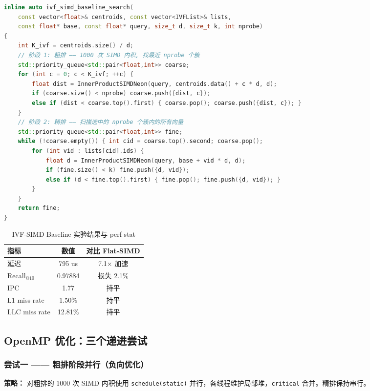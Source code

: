 \documentclass[UTF8,a4paper,10pt]{ctexart}
\begin{document}
\begin{lstlisting}[language=C++, caption={IVF-SIMD 纯串行 Baseline (IVF-baseline.cc)}]
inline auto ivf_simd_baseline_search(
    const vector<float>& centroids, const vector<IVFList>& lists,
    const float* base, const float* query, size_t d, size_t k, int nprobe)
{
    int K_ivf = centroids.size() / d;
    // 阶段 1: 粗排 —— 1000 次 SIMD 内积, 找最近 nprobe 个簇
    std::priority_queue<std::pair<float,int>> coarse;
    for (int c = 0; c < K_ivf; ++c) {
        float dist = InnerProductSIMDNeon(query, centroids.data() + c * d, d);
        if (coarse.size() < nprobe) coarse.push({dist, c});
        else if (dist < coarse.top().first) { coarse.pop(); coarse.push({dist, c}); }
    }
    // 阶段 2: 精排 —— 扫描选中的 nprobe 个簇内的所有向量
    std::priority_queue<std::pair<float,int>> fine;
    while (!coarse.empty()) { int cid = coarse.top().second; coarse.pop();
        for (int vid : lists[cid].ids) {
            float d = InnerProductSIMDNeon(query, base + vid * d, d);
            if (fine.size() < k) fine.push({d, vid});
            else if (d < fine.top().first) { fine.pop(); fine.push({d, vid}); }
        }
    }
    return fine;
}
\end{lstlisting}

\begin{table}[H]
\centering
\caption{IVF-SIMD Baseline 实验结果与 perf stat}
\begin{tabular}{lcc}
\hline
指标 & 数值 & 对比 Flat-SIMD \\
\hline
延迟 & 795 us & 7.1× 加速 \\
Recall$_{@10}$ & 0.97884 & 损失 2.1\% \\
IPC & 1.77 & 持平 \\
L1 miss rate & 1.50\% & 持平 \\
LLC miss rate & 12.81\% & 持平 \\
\hline
\end{tabular}
\end{table}

\subsection{OpenMP 优化：三个递进尝试}

\subsubsection{尝试一 —— 粗排阶段并行（负向优化）}

\textbf{策略：} 对粗排的 1000 次 SIMD 内积使用 \texttt{schedule(static)} 并行，各线程维护局部堆，\texttt{critical} 合并。精排保持串行。
\end{document}
